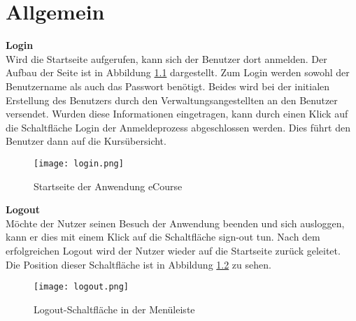 
\chapter{Allgemein}
\label{sec:chapAllgemein} 
\textbf{Login}\\
Wird die Startseite aufgerufen, kann sich der Benutzer dort anmelden. Der Aufbau der Seite ist in Abbildung \ref{fib:start} dargestellt.
Zum Login werden sowohl der Benutzername als auch das Passwort benötigt. Beides wird bei der initialen Erstellung des Benutzers durch den Verwaltungsangestellten an den Benutzer versendet. Wurden diese Informationen eingetragen, kann durch einen Klick auf die Schaltfläche \glqq Login\grqq\: der Anmeldeprozess abgeschlossen werden.
Dies führt den Benutzer dann auf die Kursübersicht.

\begin{figure}[h]
\centering
\texttt{[image: login.png]}
\caption{Startseite der Anwendung eCourse}
\label{fib:start}
\end{figure}

\textbf{Logout}\\
Möchte der Nutzer seinen Besuch der Anwendung beenden und sich ausloggen, kann er dies mit einem Klick auf die Schaltfläche \glqq sign-out\grqq\: tun. Nach dem erfolgreichen Logout wird der Nutzer wieder auf die Startseite zurück geleitet. Die Position dieser Schaltfläche ist in Abbildung \ref{fib:logout} zu sehen.

\begin{figure}[h]
\centering
\texttt{[image: logout.png]}
\caption{Logout-Schaltfläche in der Menüleiste}
\label{fib:logout}
\end{figure}